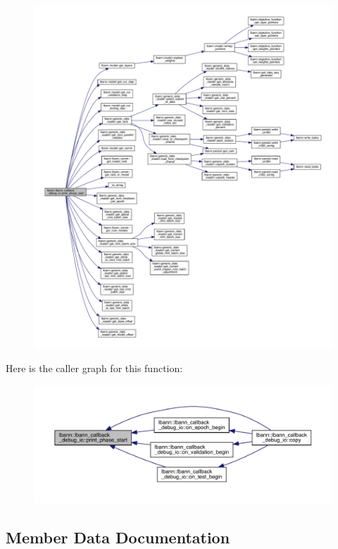 \begin{figure}[H]
\begin{center}
\leavevmode
\includegraphics[width=350pt]{classlbann_1_1lbann__callback__debug__io_a528f4aea5f657f40b27c58a164d4095a_cgraph}
\end{center}
\end{figure}
Here is the caller graph for this function\+:\nopagebreak
\begin{figure}[H]
\begin{center}
\leavevmode
\includegraphics[width=350pt]{classlbann_1_1lbann__callback__debug__io_a528f4aea5f657f40b27c58a164d4095a_icgraph}
\end{center}
\end{figure}


\subsection{Member Data Documentation}
\mbox{\label{classlbann_1_1lbann__callback__debug__io_adfd537a09e80aaa0887e5226dc52c13c}} 

